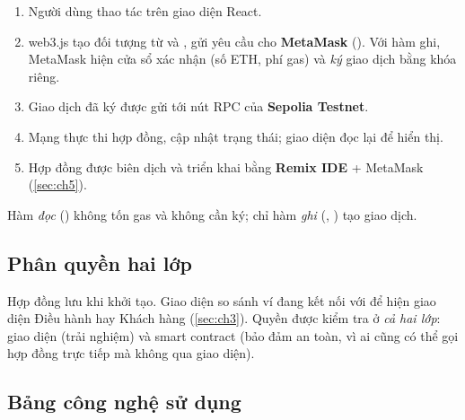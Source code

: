 \begin{enumerate}[leftmargin=1.8em]
    \item Người dùng thao tác trên giao diện React.
    \item web3.js tạo đối tượng  từ  và , gửi yêu cầu cho \textbf{MetaMask}
          (). Với hàm ghi, MetaMask hiện cửa sổ xác nhận (số ETH, phí gas) và \emph{ký} giao dịch bằng khóa riêng.
    \item Giao dịch đã ký được gửi tới nút RPC của \textbf{Sepolia Testnet}.
    \item Mạng thực thi hợp đồng, cập nhật trạng thái; giao diện đọc lại để hiển thị.
    \item[A.] Hợp đồng được biên dịch và triển khai bằng \textbf{Remix IDE} + MetaMask (\ref{sec:ch5}).
\end{enumerate}

Hàm \emph{đọc} () không tốn gas và không cần ký; chỉ hàm \emph{ghi} (, ) tạo giao dịch.

\subsection{Phân quyền hai lớp}

Hợp đồng lưu  khi khởi tạo. Giao diện so sánh ví đang kết nối với  để hiện giao diện
Điều hành hay Khách hàng (\ref{sec:ch3}). Quyền được kiểm tra ở \emph{cả hai lớp}: giao diện (trải nghiệm) và smart contract
(bảo đảm an toàn, vì ai cũng có thể gọi hợp đồng trực tiếp mà không qua giao diện).

\subsection{Bảng công nghệ sử dụng}

